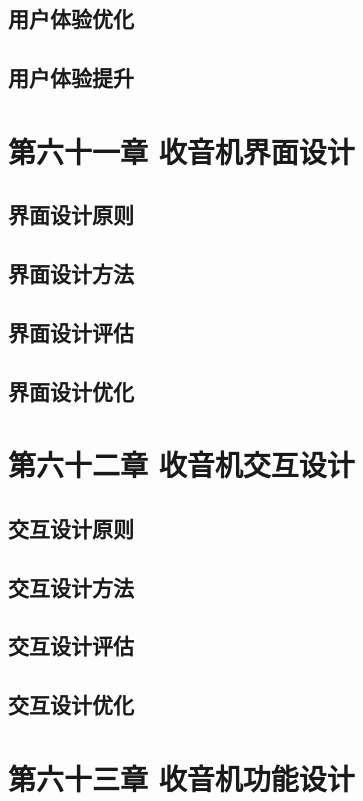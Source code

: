 \documentclass[12pt,UTF8]{ctexbook}
\begin{document}
\section{用户体验优化}
\section{用户体验提升}

\chapter{第六十一章 收音机界面设计}

\section{界面设计原则}
\section{界面设计方法}
\section{界面设计评估}
\section{界面设计优化}

\chapter{第六十二章 收音机交互设计}

\section{交互设计原则}
\section{交互设计方法}
\section{交互设计评估}
\section{交互设计优化}

\chapter{第六十三章 收音机功能设计}
\end{document}
